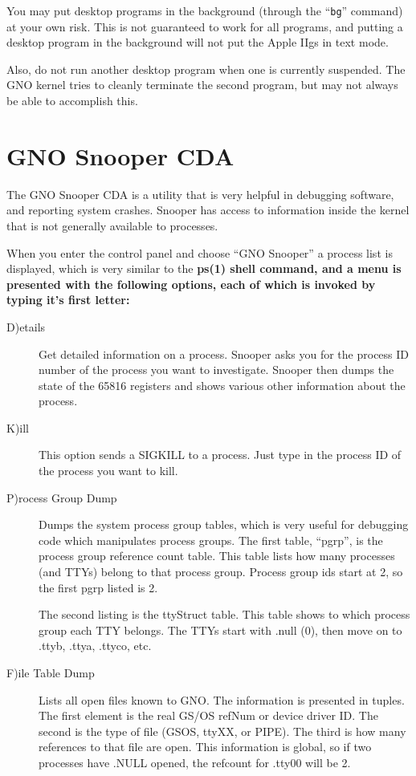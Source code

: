 \documentclass{report}
\begin{document}
You may put desktop programs in the background
(through the ``\texttt{bg}'' command) 
at your own risk. This is not guaranteed to work for all programs,
and putting a desktop program in the background will not put the
Apple IIgs in text mode.

Also, do not run another desktop program
when one is currently suspended. The GNO kernel tries to cleanly
terminate the second program, but may not always be able to
accomplish this.

\section{GNO Snooper CDA}

The GNO Snooper CDA is a utility that is
very helpful in debugging software, and reporting system crashes.
Snooper has access to information inside the kernel that is not
generally available to processes.

When you enter the control panel and choose
``GNO Snooper'' a process list is displayed, which is
very similar to the \bf ps\rm(1) shell command, and a menu is presented
with the following options, each of which is invoked by typing it's
first letter:

\begin{description}
\item[D)etails]

Get detailed information on a process.
Snooper asks you for the process ID number of the process you
want to investigate. Snooper then dumps the state of the 65816
registers and shows various other information about the process.

\item[K)ill]

This option sends a SIGKILL to a process. Just type in the process ID
of the process you want to kill.

\item[P)rocess Group Dump]

Dumps the system process group tables,
which is very useful for debugging code which manipulates process
groups. The first table, ``pgrp'', is the process group reference
count table. This table lists how many processes (and TTYs)
belong to that process group. 
Process group ids start at 2, so the first pgrp listed is 2.

The second listing is the ttyStruct table.
This table shows to which process group each TTY belongs. The TTYs start
with .null (0), then move on to .ttyb, .ttya, .ttyco, etc.

\item[F)ile Table Dump]

Lists all open files known to GNO.
The information is presented in tuples. The first element is the
real GS/OS refNum or device driver ID. The second is the type of
file (GSOS, ttyXX, or PIPE). The third is how many references to
that file are open. This information is global, so if two
processes have .NULL opened, the refcount for .tty00 will be 2.

\end{description}



\parindent=20pt
\end{document}
